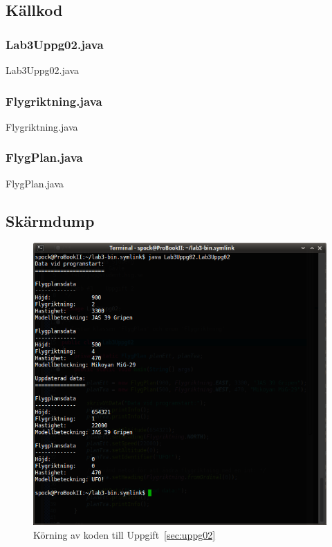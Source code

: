 \subsection{Källkod}
\subsubsection{Lab3Uppg02.java}
\caption{Lab3Uppg02.java}
\label{src:uppg02}

\subsubsection{Flygriktning.java}
\caption{Flygriktning.java}
\label{src:flygriktning}

\subsubsection{FlygPlan.java}
\caption{FlygPlan.java}
\label{src:flygplan}


\subsection{Skärmdump}
\begin{figure}[htbp]
    \centering
        \includegraphics[width=\linewidth]{img/02.png}
    \caption{Körning av koden till Uppgift~\ref{sec:uppg02}}
    \label{fig:uppg02-screenshot}
\end{figure}

